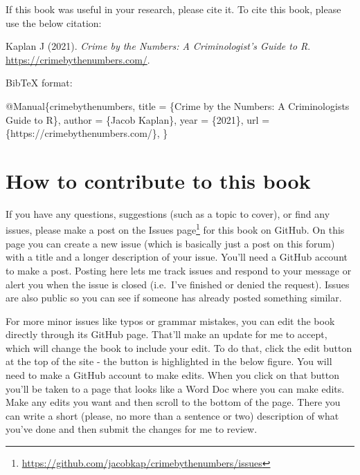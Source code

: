 \documentclass[
]{krantz}
\makeatletter
\newenvironment{Shaded}{\begin{snugshade}}{\end{snugshade}}
\newcommand{\DataTypeTok}[1]{\textcolor[rgb]{0.27,0.27,0.27}{#1}}
\newcommand{\NormalTok}[1]{#1}
\newcommand{\OtherTok}[1]{\textcolor[rgb]{0.37,0.37,0.37}{#1}}
\newcommand{\VariableTok}[1]{\textcolor[rgb]{0,0,0}{#1}}
\renewcommand{\href}[2]{#2\footnote{\url{#1}}}
\newenvironment{kframe}{%
\medskip{}
\setlength{\fboxsep}{.8em}
 \def\at@end@of@kframe{}%
 \ifinner\ifhmode%
  \def\at@end@of@kframe{\end{minipage}}%
  \begin{minipage}{\columnwidth}%
 \fi\fi%
 \def\FrameCommand##1{\hskip\@totalleftmargin \hskip-\fboxsep
 \colorbox{shadecolor}{##1}\hskip-\fboxsep
     \hskip-\linewidth \hskip-\@totalleftmargin \hskip\columnwidth}%
 \MakeFramed {\advance\hsize-\width
   \@totalleftmargin\z@ \linewidth\hsize
   \@setminipage}}%
 {\par\unskip\endMakeFramed%
 \at@end@of@kframe}
\renewenvironment{Shaded}{\begin{kframe}}{\end{kframe}}
\makeatother
\begin{document}
If this book was useful in your research, please cite it. To
cite this book, please use the below citation:

Kaplan J (2021). \emph{Crime by the Numbers: A
Criminologist's Guide to R}.
\url{https://crimebythenumbers.com/}.

BibTeX format:

\begin{Shaded}
\begin{Highlighting}[]
\VariableTok{@Manual}\NormalTok{\{}\OtherTok{crimebythenumbers}\NormalTok{,}
  \DataTypeTok{title}\NormalTok{ = \{Crime by the Numbers: A Criminologist\textquotesingle{}s Guide to R\},}
  \DataTypeTok{author}\NormalTok{ = \{Jacob Kaplan\},}
  \DataTypeTok{year}\NormalTok{ = \{2021\},}
  \DataTypeTok{url}\NormalTok{ = \{https://crimebythenumbers.com/\},}
\NormalTok{\}}
\end{Highlighting}
\end{Shaded}

\hypertarget{how-to-contribute-to-this-book}{%
\section*{How to contribute to this
book}\label{how-to-contribute-to-this-book}}

If you have any questions, suggestions (such as a topic to
cover), or find any issues, please make a post on the
\href{https://github.com/jacobkap/crimebythenumbers/issues}{Issues
page} for this book on GitHub. On this page you can create a
new issue (which is basically just a post on this forum)
with a title and a longer description of your issue. You'll
need a GitHub account to make a post. Posting here lets me
track issues and respond to your message or alert you when
the issue is closed (i.e.~I've finished or denied the
request). Issues are also public so you can see if someone
has already posted something similar.

For more minor issues like typos or grammar mistakes, you
can edit the book directly through its GitHub page. That'll
make an update for me to accept, which will change the book
to include your edit. To do that, click the edit button at
the top of the site - the button is highlighted in the below
figure. You will need to make a GitHub account to make
edits. When you click on that button you'll be taken to a
page that looks like a Word Doc where you can make edits.
Make any edits you want and then scroll to the bottom of the
page. There you can write a short (please, no more than a
sentence or two) description of what you've done and then
submit the changes for me to review.
\end{document}
